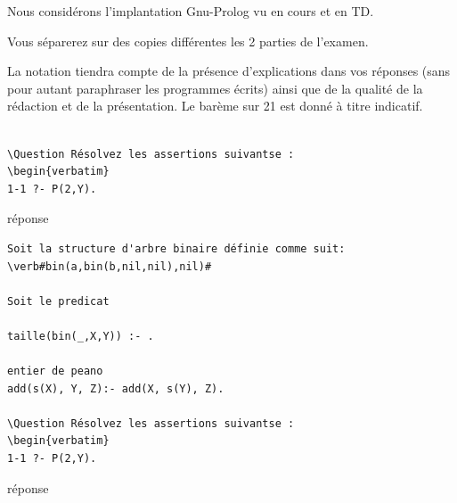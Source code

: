\documentclass[a4paper]{article}
\newenvironment{CAnswer}{\color{red}\begin{Answer}}
                        {\end{Answer}}
\begin{document}
Nous considérons l'implantation Gnu-Prolog vu en cours et en TD.

{\Large Vous séparerez sur des copies différentes les 2 parties de l'examen.}

La notation tiendra compte de la présence d'explications dans vos réponses (sans
pour autant paraphraser les programmes écrits) ainsi que de la qualité de la
rédaction et de la présentation. Le barème sur 21 est donné à titre indicatif.

\begin{Exercise}[title={Résolution}]

\begin{verbatim}

\Question Résolvez les assertions suivantse :
\begin{verbatim}
1-1 ?- P(2,Y).
\end{verbatim}
\begin{CAnswer}
réponse
\end{CAnswer}
\end{Exercise}

\begin{Exercise}[title={Arbres binaires}]

\begin{verbatim}
Soit la structure d'arbre binaire définie comme suit:
\verb#bin(a,bin(b,nil,nil),nil)#

Soit le predicat 

taille(bin(_,X,Y)) :- .

entier de peano
add(s(X), Y, Z):- add(X, s(Y), Z).

\Question Résolvez les assertions suivantse :
\begin{verbatim}
1-1 ?- P(2,Y).
\end{verbatim}
\begin{CAnswer}
réponse
\end{CAnswer}
\end{Exercise}
\end{document}
